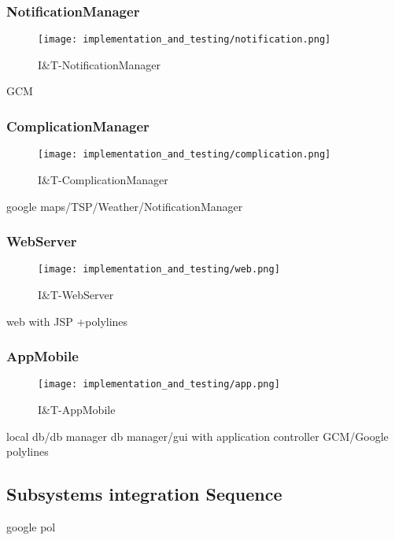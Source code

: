 \subsubsection{NotificationManager}
\begin{figure}[H]
	\begin{center}
		\texttt{[image: implementation\_and\_testing/notification.png]}
	\end{center}
	\caption{I\&T-NotificationManager}
\end{figure}
GCM

\subsubsection{ComplicationManager}
\begin{figure}[H]
	\begin{center}
		\texttt{[image: implementation\_and\_testing/complication.png]}
	\end{center}
	\caption{I\&T-ComplicationManager}
\end{figure}
google maps/TSP/Weather/NotificationManager

\subsubsection{WebServer}
\begin{figure}[H]
	\begin{center}
		\texttt{[image: implementation\_and\_testing/web.png]}
	\end{center}
	\caption{I\&T-WebServer}
\end{figure}
web with JSP +polylines

\subsubsection{AppMobile}
\begin{figure}[H]
	\begin{center}
		\texttt{[image: implementation\_and\_testing/app.png]}
	\end{center}
	\caption{I\&T-AppMobile}
\end{figure}
local db/db manager
db manager/gui with application controller
GCM/Google polylines

\subsection{Subsystems integration Sequence}
google pol